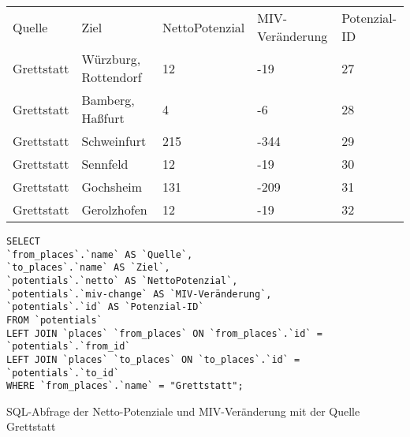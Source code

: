 \begin{tabular}{ l  l  l  l  l }
Quelle & Ziel & NettoPotenzial & MIV-Veränderung & Potenzial-ID\\ 
Grettstatt & Würzburg, Rottendorf & 12 & -19 & 27\\ 
Grettstatt & Bamberg, Haßfurt & 4 & -6 & 28\\ 
Grettstatt & Schweinfurt & 215 & -344 & 29\\ 
Grettstatt & Sennfeld & 12 & -19 & 30\\ 
Grettstatt & Gochsheim & 131 & -209 & 31\\ 
Grettstatt & Gerolzhofen & 12 & -19 & 32\\ 
\end{tabular}       
\newline
\newline
\begin{listing}[htbp]
\begin{verbatim}
SELECT
`from_places`.`name` AS `Quelle`, 
`to_places`.`name` AS `Ziel`, 
`potentials`.`netto` AS `NettoPotenzial`, 
`potentials`.`miv-change` AS `MIV-Veränderung`, 
`potentials`.`id` AS `Potenzial-ID`
FROM `potentials`
LEFT JOIN `places` `from_places` ON `from_places`.`id` = `potentials`.`from_id`
LEFT JOIN `places` `to_places` ON `to_places`.`id` = `potentials`.`to_id`
WHERE `from_places`.`name` = "Grettstatt";
\end{verbatim}
\caption{SQL-Abfrage der Netto-Potenziale und MIV-Veränderung mit der Quelle Grettstatt}\label{lst-fz-grettstatt}
\end{listing}